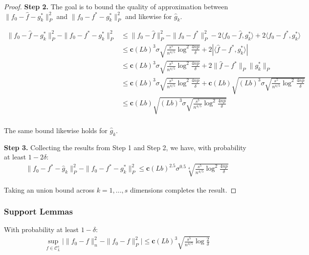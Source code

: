 \begin{proof}
\textbf{Step 2.} The goal is to bound the quality of approximation between $\| f_0 - \hat{f} - g^*_k \|_P^2$ and $\| f_0 - f^* - g^*_k \|_P^2$ and likewise for $\hat{g}_k$.

\begin{align*}
\| f_0 - \hat{f} - g^*_k \|_P^2 - \| f_0 - f^* - g^*_k\|_P^2 &\leq 
    \| f_0 - \hat{f} \|_P^2 - \|f_0 - f^*\|_P^2 - 2\langle f_0 - \hat{f}, g^*_k \rangle
   + 2 \langle f_0 - f^*, g^*_k \rangle \\
 &\leq \mathbf{c} (Lb)^3 \sigma \sqrt{ \frac{s^5}{n^{4/5}} \log^2 \frac{4np}{\delta}} + 
    2 | \langle \hat{f} - f^*, g^*_k \rangle |  \\
 &\leq  \mathbf{c} (Lb)^3 \sigma \sqrt{ \frac{s^5}{n^{4/5}} \log^2 \frac{4np}{\delta}} +
    2 \| \hat{f} - f^* \|_P \| g^*_k \|_P \\
&\leq  \mathbf{c} (Lb)^3 \sigma \sqrt{ \frac{s^5}{n^{4/5}} \log^2 \frac{4np}{\delta}} +
   \mathbf{c}(Lb) \sqrt{(Lb)^3\sigma \sqrt{ 
                   \frac{s^5}{n^{4/5}} \log^2 \frac{4np}{\delta}} }\\
&\leq  \mathbf{c}(Lb) \sqrt{(Lb)^3\sigma \sqrt{ 
                   \frac{s^5}{n^{4/5}} \log^2 \frac{4np}{\delta}} }\\
\end{align*}

The same bound likewise holds for $\hat{g}_k$.

\textbf{Step 3.} Collecting the results from Step 1 and Step 2, we have, with probability at least $1-2\delta$:
\begin{align*}
\| f_0 - f^* - \hat{g}_k \|_P^2 - \|f_0 - f^* - g^*_k \|_P^2 \leq
   \mathbf{c}(Lb)^{2.5} \sigma^{0.5} 
     \sqrt[4]{ \frac{s^5}{n^{4/5}} \log^2 \frac{4np}{\delta}} 
\end{align*}

Taking an union bound across $k=1,...,s$ dimensions completes the result.

\end{proof}








\subsubsection{Support Lemmas}


\begin{lemma}
\label{lem:uniform_convergence}
With probability at least $1-\delta$:
\begin{align*}
\sup_{f \in \mathcal{C}^s_L} \Big| \| f_0 - f \|^2_n - \|f_0 - f \|^2_P\Big| \leq
   \mathbf{c} (Lb)^3 \sqrt{ \frac{s^5}{n^{4/5}} \log \frac{2}{\delta}}
\end{align*}

\end{lemma}


